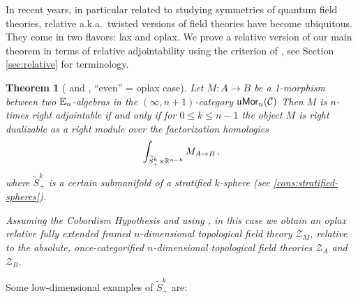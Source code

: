 \documentclass[10pt, reqno, twoside
, final
]{amsart}
\numberwithin{equation}{subsection}%
\newtheorem{thmx}{Theorem}
\theoremstyle{definition}
\theoremstyle{definition}
\theoremstyle{definition}
\theoremstyle{definition}
\theoremstyle{definition}
\theoremstyle{definition}
\theoremstyle{definition}
\theoremstyle{definition}
\theoremstyle{definition}
\theoremstyle{plain}
\theoremstyle{definition}
\theoremstyle{plain}
\theoremstyle{definition}
\theoremstyle{plain}
\theoremstyle{definition}
\theoremstyle{definition}
\theoremstyle{plain}
\theoremstyle{plain}
\theoremstyle{definition}
\theoremstyle{plain}
\theoremstyle{plain}
\theoremstyle{plain}
\begin{document}
In recent years, in particular related to studying symmetries of quantum field theories, relative a.k.a.~twisted versions of field theories have become ubiquitous. They come in two flavors: lax and oplax.
We prove a relative version of our main theorem in terms of relative adjointability using the criterion of \cite{JFS}, see Section \ref{sec:relative} for terminology.
\begin{thmx}[ and , ``even'' = oplax case]\label{thmx:main-oplax-thm}
 Let $M:A\to B$ be a 1-morphism between two $\mathbb{E}_n$-algebras in the $(\infty,n+1)$-category $\mathfrak{u}\mathsf{Mor}_n(\mathcal{C})$ 
Then $M$ is $n$-times right adjointable if and only if for $0\leq k \leq n-1$ the object $M$ is right dualizable as a right module over the factorization homologies 
\[  \int_{\widetilde{S}^{k}_{+} \times \mathbb{R}^{n-k}} M_{A\to B} \, ,\] 
 where $\widetilde{S}^{k}_{+}$ is a certain submanifold of a stratified $k$-sphere (see \cref{cons:stratified-spheres}).


Assuming the Cobordism Hypothesis and using \cite{JFS}, in this case we obtain an oplax relative fully extended framed $n$-dimensional topological  field theory $\mathcal{Z}_M$, relative to the absolute, once-categorified $n$-dimensional topological field theories $\mathcal{Z}_A$ and $\mathcal{Z}_B$.
\end{thmx}

Some low-dimensional examples of $\widetilde{S}^k_+$ are:
\end{document}
